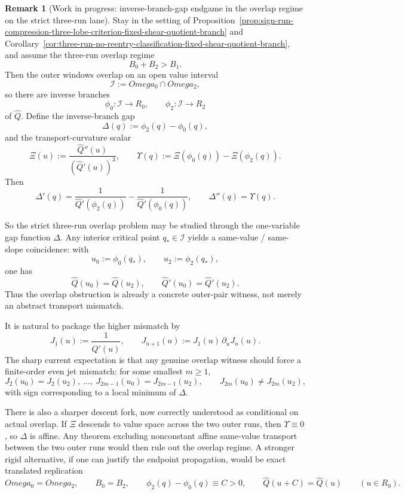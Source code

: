 \documentclass[11pt,a4paper]{amsart}
\def\Omega{Omega}%
\theoremstyle{plain}
\theoremstyle{definition}
\newtheorem{remark}[theorem]{Remark}
\begin{document}
\begin{remark}[Work in progress: inverse-branch-gap endgame in the overlap regime on the strict three-run lane]
\label{rem:wip-inverse-branch-gap-endgame-fixed-shear}
Stay in the setting of
Proposition~\ref{prop:sign-run-compression-three-lobe-criterion-fixed-shear-quotient-branch}
and
Corollary~\ref{cor:three-run-no-reentry-classification-fixed-shear-quotient-branch},
and assume the three-run overlap regime
\[
B_0+B_2>B_1.
\]
Then the outer windows overlap on an open value interval
\[
\mathcal I:=\Omega_0\cap\Omega_2,
\]
so there are inverse branches
\[
\phi_0:\mathcal I\to R_0,
\qquad
\phi_2:\mathcal I\to R_2
\]
of $\widehat Q$. Define the inverse-branch gap
\[
\Delta(q):=\phi_2(q)-\phi_0(q),
\]
and the transport-curvature scalar
\[
\Xi(u):=\frac{\widehat Q''(u)}{(\widehat Q'(u))^3},
\qquad
\Upsilon(q):=\Xi(\phi_0(q))-\Xi(\phi_2(q)).
\]
Then
\[
\Delta'(q)=\frac{1}{\widehat Q'(\phi_2(q))}
-\frac{1}{\widehat Q'(\phi_0(q))},
\qquad
\Delta''(q)=\Upsilon(q).
\]

So the strict three-run overlap problem may be studied through the
one-variable gap function $\Delta$. Any interior critical point
$q_*\in\mathcal I$ yields a same-value / same-slope coincidence: with
\[
u_0:=\phi_0(q_*),\qquad u_2:=\phi_2(q_*),
\]
one has
\[
\widehat Q(u_0)=\widehat Q(u_2),
\qquad
\widehat Q'(u_0)=\widehat Q'(u_2).
\]
Thus the overlap obstruction is already a concrete outer-pair witness, not
merely an abstract transport mismatch.

It is natural to package the higher mismatch by
\[
J_1(u):=\frac{1}{\widehat Q'(u)},
\qquad
J_{n+1}(u):=J_1(u)\,\partial_u J_n(u).
\]
The sharp current expectation is that any genuine overlap witness should force a
finite-order even jet mismatch: for some smallest $m\ge 1$,
\[
J_2(u_0)=J_2(u_2),\ \dots,\ J_{2m-1}(u_0)=J_{2m-1}(u_2),
\qquad
J_{2m}(u_0)\neq J_{2m}(u_2),
\]
with sign corresponding to a local minimum of $\Delta$.

There is also a sharper descent fork, now correctly understood as conditional on
actual overlap. If $\Xi$ descends to value space across the two outer runs,
then $\Upsilon\equiv 0$, so $\Delta$ is affine. Any theorem excluding
nonconstant affine same-value transport between the two outer runs would then
rule out the overlap regime. A stronger rigid alternative, if one can justify
the endpoint propagation, would be exact translated replication
\[
\Omega_0=\Omega_2,
\qquad
B_0=B_2,
\qquad
\phi_2(q)-\phi_0(q)\equiv C>0,
\qquad
\widehat Q(u+C)=\widehat Q(u)\qquad (u\in R_0).
\]


\end{remark}
\end{document}
